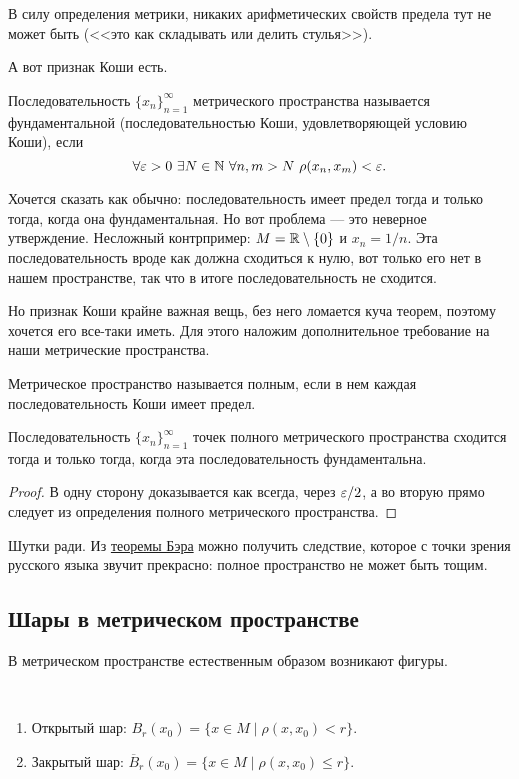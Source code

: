 В силу определения метрики, никаких арифметических свойств предела тут не может быть (<<это как складывать или делить стулья>>).

А вот признак Коши есть.
\begin{Def}
Последовательность $\{x_n\}_{n=1}^\infty$ метрического пространства называется фундаментальной (последовательностью Коши, удовлетворяющей условию Коши), если
$$
\forall \varepsilon > 0 \ \exists N \in \mathbb{N}\ \forall n, m > N\ \rho(x_n, x_m) < \varepsilon.
$$
\end{Def}

Хочется сказать как обычно: последовательность имеет предел тогда и только тогда, когда она фундаментальная. Но вот проблема --- это неверное утверждение. Несложный контрпример: $M = \mathbb{R}\setminus\{0\}$ и $x_n = 1/n$. Эта последовательность вроде как должна сходиться к нулю, вот только его нет в нашем пространстве, так что в итоге последовательность не сходится.

Но признак Коши крайне важная вещь, без него ломается куча теорем, поэтому хочется его все-таки иметь. Для этого наложим дополнительное требование на наши метрические пространства.
\begin{Def}
Метрическое пространство называется полным, если в нем каждая последовательность Коши имеет предел.
\end{Def}

\begin{Theorem}
Последовательность $\{x_n\}_{n=1}^\infty$ точек полного метрического пространства сходится тогда и только тогда, когда эта последовательность фундаментальна.
\end{Theorem}
\begin{proof}
В одну сторону доказывается как всегда, через $\varepsilon/2$, а во вторую прямо следует из определения полного метрического пространства.
\end{proof}

\begin{Comment}
Шутки ради. Из \href{https://goo.gl/drRQz0}{теоремы Бэра} можно получить следствие, которое с точки зрения русского языка звучит прекрасно: полное пространство не может быть тощим.
\end{Comment}

\subsection*{Шары в метрическом пространстве}
В метрическом пространстве естественным образом возникают фигуры.
\begin{Def}\ 
\begin{enumerate}
\item Открытый шар: $B_r(x_0) = \{x \in M \mid \rho(x, x_0) < r  \}$.
\item Закрытый шар: $\overline{B}_r(x_0) = \{x \in M \mid \rho(x, x_0) \leq r  \}$.
\end{enumerate}
\end{Def}

